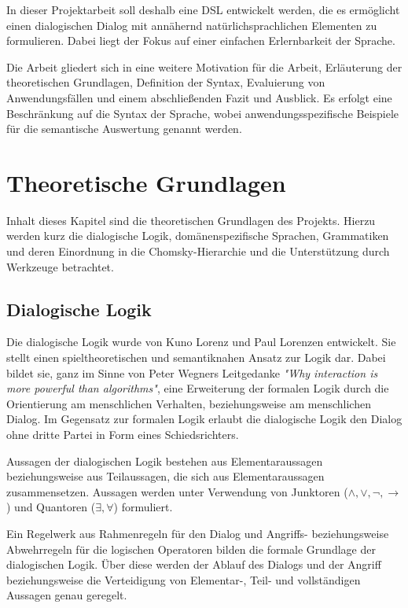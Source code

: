 \documentclass[11pt,a4paper,bibtotocnumbered]{scrreprt}
\begin{document}
In dieser Projektarbeit soll deshalb eine \ac{DSL} entwickelt werden, die es ermöglicht einen dialogischen Dialog mit annähernd natürlichsprachlichen Elementen zu formulieren. 
Dabei liegt der Fokus auf einer einfachen Erlernbarkeit der Sprache.

Die Arbeit gliedert sich in eine weitere Motivation für die Arbeit, Erläuterung der theoretischen Grundlagen, Definition der Syntax, Evaluierung von Anwendungsfällen und einem abschließenden Fazit und Ausblick.
Es erfolgt eine Beschränkung auf die Syntax der Sprache, wobei anwendungsspezifische Beispiele für die semantische Auswertung genannt werden.

\chapter{Theoretische Grundlagen}  %
Inhalt dieses Kapitel sind die theoretischen Grundlagen des Projekts. Hierzu werden kurz die dialogische Logik, domänenspezifische Sprachen, Grammatiken und deren Einordnung in die Chomsky-Hierarchie und die Unterstützung durch Werkzeuge betrachtet.

\section{Dialogische Logik}
Die dialogische Logik wurde von Kuno Lorenz und Paul Lorenzen entwickelt. Sie stellt einen spieltheoretischen und semantiknahen Ansatz zur Logik dar. Dabei bildet sie, ganz im Sinne von Peter Wegners Leitgedanke \emph{"Why interaction is more powerful than algorithms"}, eine Erweiterung der formalen Logik durch die Orientierung am menschlichen Verhalten, beziehungsweise am menschlichen Dialog.
Im Gegensatz zur formalen Logik erlaubt die dialogische Logik den Dialog ohne dritte Partei in Form eines Schiedsrichters.

Aussagen der dialogischen Logik bestehen aus Elementaraussagen beziehungsweise aus Teilaussagen, die sich aus Elementaraussagen zusammensetzen. Aussagen werden unter Verwendung von Junktoren ($\land, \lor, \lnot, \to$) und Quantoren ($\exists, \forall$) formuliert.

Ein Regelwerk aus Rahmenregeln für den Dialog und Angriffs- beziehungsweise Abwehrregeln für die logischen Operatoren bilden die formale Grundlage der dialogischen Logik. Über diese werden der Ablauf des Dialogs und der Angriff beziehungsweise die Verteidigung von Elementar-, Teil- und vollständigen Aussagen genau geregelt.
\end{document}
